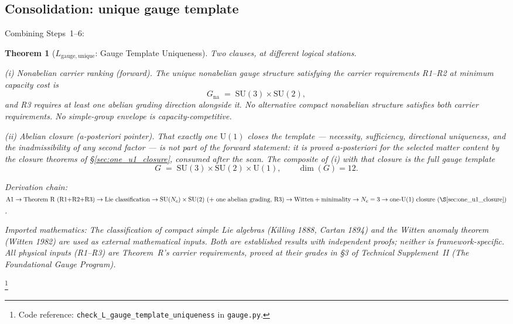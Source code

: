 \documentclass[11pt]{article}
\newtheorem{theorem}{Theorem}[section]
\theoremstyle{definition}
\newcommand{\SU}{\mathrm{SU}}
\newcommand{\U}{\mathrm{U}}
\newcommand{\coderef}[2]{\footnote{Code reference: \texttt{#1} in \texttt{#2}.}}
\newcommand{\TSII}{Technical Supplement~II (\emph{The Foundational Gauge Program})}
\begin{document}
\subsection{Consolidation: unique gauge template}
\label{sec:gauge_consolidation}

Combining Steps~1--6:

\begin{theorem}[$L_{\mathrm{gauge,unique}}$: Gauge Template Uniqueness]\label{thm:gauge_unique}
Two clauses, at different logical stations.

\smallskip\noindent\textit{(i) Nonabelian carrier ranking (forward).}\quad
The unique nonabelian gauge structure satisfying the carrier
requirements R1--R2 at minimum capacity cost is
\[
  G_{\mathrm{na}} \;=\; \SU(3) \times \SU(2),
\]
and R3 requires at least one abelian grading direction alongside it.
No alternative compact nonabelian structure satisfies both carrier
requirements.  No simple-group envelope is capacity-competitive.

\smallskip\noindent\textit{(ii) Abelian closure (a-posteriori pointer).}\quad
That exactly one $\U(1)$ closes the template --- necessity,
sufficiency, directional uniqueness, and the inadmissibility of any
second factor --- is not part of the forward statement: it is proved
a-posteriori for the selected matter content by the closure theorems
of \S\ref{sec:one_u1_closure}, consumed after the scan.  The composite
of (i) with that closure is the full gauge template
\[
  G \;=\; \SU(3) \times \SU(2) \times \U(1),
  \qquad \dim(G) = 12.
\]

\smallskip\noindent\textit{Derivation chain:}\quad
$\text{A1} \to \text{Theorem R (R1+R2+R3)} \to
\text{Lie classification} \to
\SU(N_c) \times \SU(2)\ (+\text{ one abelian grading, R3}) \to
\text{Witten} + \text{minimality} \to N_c = 3 \to
\text{one-U(1) closure (\S\ref{sec:one_u1_closure})}$.

\smallskip\noindent\textit{Imported mathematics:}\quad
The classification of compact simple Lie algebras (Killing 1888, Cartan 1894)
and the Witten anomaly theorem (Witten 1982) are used as external
mathematical inputs.  Both are established results with independent
proofs; neither is framework-specific.  All physical inputs (R1--R3)
are Theorem~R's carrier requirements, proved at their grades in
\S3 of \TSII{}.
\end{theorem}
\coderef{check\_L\_gauge\_template\_uniqueness}{gauge.py}




\newpage
\end{document}
